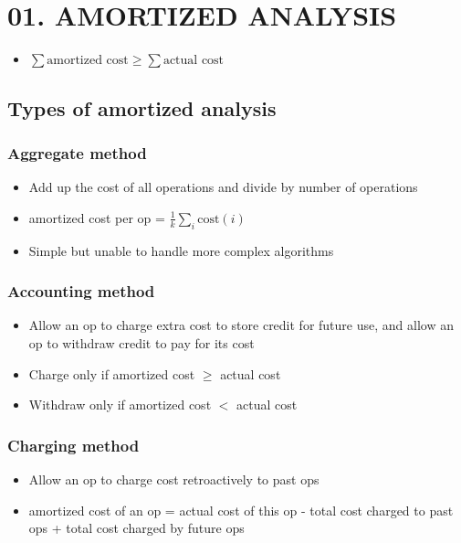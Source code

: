 \documentclass[10pt, landscape]{article}
\begin{document}
\section{01. AMORTIZED ANALYSIS}

\begin{itemize}
	\item $\sum{\text{amortized cost}} \ge \sum{\text{actual cost}}$
\end{itemize}

\subsection{Types of amortized analysis}

\subsubsection{Aggregate method}

\begin{itemize}
	\item Add up the cost of all operations and divide by number of operations
	\item amortized cost per op = $\frac{1}{k} \sum_{i}{\text{cost}(i)}$
	\item Simple but unable to handle more complex algorithms
\end{itemize}

\subsubsection{Accounting method}

\begin{itemize}
	\item Allow an op to charge extra cost to store credit for future use, and allow an op to withdraw credit to pay for its cost
	\item Charge only if amortized cost $\ge$ actual cost
	\item Withdraw only if amortized cost $<$ actual cost
\end{itemize}

\subsubsection{Charging method}

\begin{itemize}
	\item Allow an op to charge cost retroactively to past ops
	\item amortized cost of an op = actual cost of this op - total cost charged to past ops + total cost charged by future ops
\end{itemize}
\end{document}
